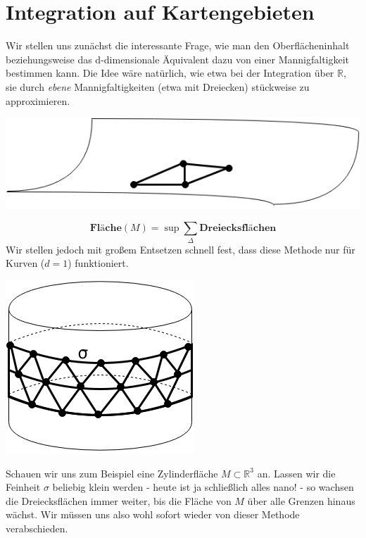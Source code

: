 \section{Integration auf Kartengebieten}
Wir stellen uns zunächst die interessante Frage, wie man den Oberflächeninhalt beziehungsweise das d-dimensionale Äquivalent dazu von einer Mannigfaltigkeit bestimmen kann. 
Die Idee wäre natürlich, wie etwa bei der Integration über $\mathbb{R}$, sie durch \emph{ebene} Mannigfaltigkeiten (etwa mit Dreiecken) stückweise zu approximieren.\\
\begin{center}
	\includegraphics[scale=0.5]{pictures/003-03.png}
\end{center}
\begin{equation*}
\textbf{Fläche}(M)=\sup \sum\limits_\Delta \textbf{Dreiecksflächen}
\end{equation*}
Wir stellen jedoch mit großem Entsetzen schnell fest, dass diese Methode nur für Kurven ($d=1$) funktioniert.\\
\begin{center}
	\includegraphics[scale=0.5]{pictures/003-04.png}
\end{center}
Schauen wir uns zum Beispiel eine Zylinderfläche $M\subset\mathbb{R}^3$ an. 
Lassen wir die Feinheit $\sigma$ beliebig klein werden - heute ist ja schließlich alles nano! - so wachsen die Dreiecksflächen immer weiter, 
bis die Fläche von $M$ über alle Grenzen hinaus wächst. Wir müssen uns also wohl sofort wieder von dieser Methode verabschieden.\\
